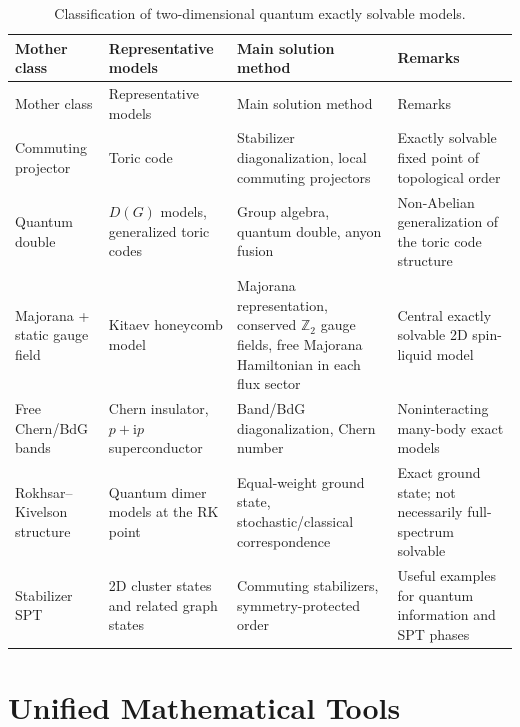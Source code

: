 \documentclass[12pt,openany]{book}
\theoremstyle{definition}
\theoremstyle{plain}
\newcommand{\ii}{\mathrm{i}}
\newcommand{\ZZ}{\mathbb{Z}}
\begin{document}
{\footnotesize\setlength{\tabcolsep}{3pt}\begin{longtable}{L{0.20\textwidth}L{0.23\textwidth}L{0.25\textwidth}L{0.17\textwidth}}
\caption{Classification of two-dimensional quantum exactly solvable models.}\label{tab:2d-quantum-taxonomy}\\
\toprule
Mother class & Representative models & Main solution method & Remarks \\
\midrule
\endfirsthead
\toprule
Mother class & Representative models & Main solution method & Remarks \\
\midrule
\endhead
Commuting projector & Toric code & Stabilizer diagonalization, local commuting projectors & Exactly solvable fixed point of topological order \\
Quantum double & $D(G)$ models, generalized toric codes & Group algebra, quantum double, anyon fusion & Non-Abelian generalization of the toric code structure \\
Majorana + static gauge field & Kitaev honeycomb model & Majorana representation, conserved $\ZZ_2$ gauge fields, free Majorana Hamiltonian in each flux sector & Central exactly solvable 2D spin-liquid model \\
Free Chern/BdG bands & Chern insulator, $p+\ii p$ superconductor & Band/BdG diagonalization, Chern number & Noninteracting many-body exact models \\
Rokhsar--Kivelson structure & Quantum dimer models at the RK point & Equal-weight ground state, stochastic/classical correspondence & Exact ground state; not necessarily full-spectrum solvable \\
Stabilizer SPT & 2D cluster states and related graph states & Commuting stabilizers, symmetry-protected order & Useful examples for quantum information and SPT phases \\
\bottomrule
\end{longtable}}

\part{Unified Mathematical Tools}






\end{document}
